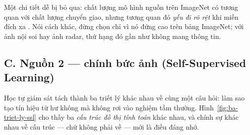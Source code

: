\documentclass[../../../deep_learning.tex]{subfiles}
\begin{document}
Một chi tiết dễ bị bỏ qua: chất lượng mô hình nguồn trên ImageNet có tương quan với chất lượng chuyển giao, nhưng tương quan đó \emph{yếu đi rõ rệt} khi miền đích xa \cite{kornblith2019better}. Nói cách khác, đừng chọn  chỉ vì nó đứng cao trên bảng ImageNet; với ảnh nội soi hay ảnh radar, thứ hạng đó gần như không mang thông tin.

\subsection{C. Nguồn 2 --- chính bức ảnh (Self-Supervised Learning)}
Học tự giám sát tách thành ba triết lý khác nhau về cùng một câu hỏi: làm sao tạo tín hiệu từ hư không mà không rơi vào nghiệm tầm thường. Hình~\ref{fig:ba-triet-ly-ssl} cho thấy ba \emph{cấu trúc đồ thị tính toán} khác nhau, và chính sự khác nhau về cấu trúc --- chứ không phải về  --- mới là điều đáng nhớ.
\end{document}
